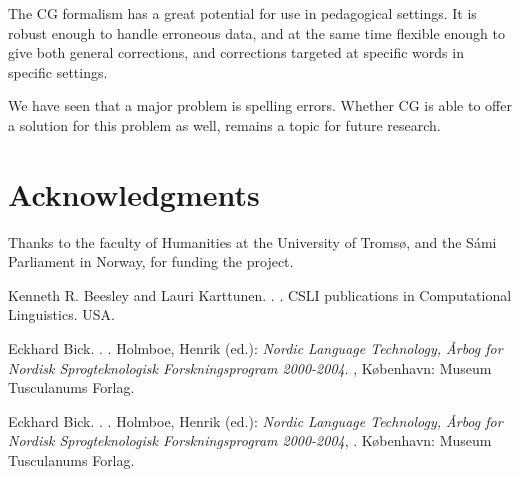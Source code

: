\documentclass[11pt]{article}
\begin{document}
The CG formalism has a great potential for use in pedagogical settings.
It is robust enough to handle erroneous data, and at the same time flexible enough to give both general corrections, and corrections targeted at specific words in specific settings.

We have seen that a major problem is spelling errors. Whether CG is able to offer a solution for this problem as well, remains a topic for future research.

\section*{Acknowledgments}
Thanks to the faculty of Humanities at the University of Tromsø, and the Sámi Parliament in Norway, for funding the project. 

\begin{thebibliography}{}

{Kenneth R. Beesley and Lauri Karttunen}.
.
.
\newblock CSLI publications in Computational Linguistics.
\newblock USA.

{Eckhard Bick}.
.
.
\newblock Holmboe, Henrik (ed.): {\em Nordic Language Technology, Årbog for Nordisk Sprogteknologisk Forskningsprogram 2000-2004}.
,
\newblock København: Museum Tusculanums Forlag.

{Eckhard Bick}.
.
.
\newblock Holmboe, Henrik (ed.): {\em Nordic Language Technology, Årbog for Nordisk Sprogteknologisk Forskningsprogram 2000-2004},
.
\newblock København: Museum Tusculanums Forlag.



\end{thebibliography}
\end{document}
